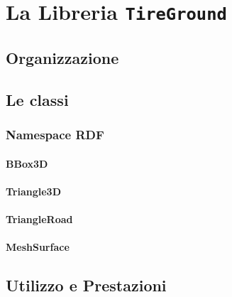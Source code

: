 \chapter{La Libreria \texttt{TireGround}}
\label{Codice}
%
\section{Organizzazione}

\section{Le classi}
\subsection{Namespace RDF}
\subsubsection{BBox3D}
\subsubsection{Triangle3D}
\subsubsection{TriangleRoad}
\subsubsection{MeshSurface}


\section{Utilizzo e Prestazioni}

